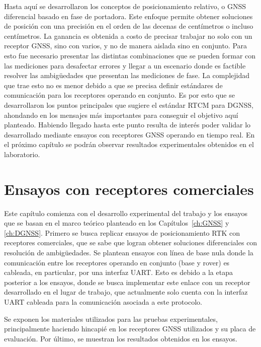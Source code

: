 \documentclass[a4paper,12pt,oneside,onecolumn,final,openright]{book}%
\begin{document}
	Hasta aquí se desarrollaron los conceptos de posicionamiento relativo, o GNSS diferencial basado en fase de portadora. Este enfoque permite obtener soluciones de posición con una precisión en el orden de las decenas de centímetros o incluso centímetros. La ganancia es obtenida a costo de precisar trabajar no solo con un receptor GNSS, sino con varios, y no de manera aislada sino en conjunto. Para esto fue necesario presentar las distintas combinaciones que se pueden formar con las mediciones para desafectar errores y llegar a un escenario donde es factible resolver las ambigüedades que presentan las mediciones de fase. La complejidad que trae esto no es menor debido a que se precisa definir estándares de comunicación para los receptores operando en conjunto. Es por esto que se desarrollaron los puntos principales que sugiere el estándar RTCM para DGNSS, ahondando en los mensajes más importantes para conseguir el objetivo aquí planteado. Habiendo llegado hasta este punto resulta de interés poder validar lo desarrollado mediante ensayos con receptores GNSS operando en tiempo real. En el próximo capítulo se podrán observar resultados experimentales obtenidos en el laboratorio.
\chapter{Ensayos con receptores comerciales}\label{ch:ublox}
	Este capítulo comienza con el desarrollo experimental del trabajo y los ensayos que se basan en el marco teórico planteado en los Capítulos~\ref{ch:GNSS} y \ref{ch:DGNSS}. Primero se busca replicar ensayos de posicionamiento RTK con receptores comerciales, que se sabe que logran obtener soluciones diferenciales con resolución de ambigüedades. Se plantean ensayos con línea de base nula donde la comunicación entre los receptores operando en conjunto (base y rover) es cableada, en particular, por una interfaz UART. Esto es debido a la etapa posterior a los ensayos, donde se busca implementar este enlace con un receptor desarrollado en el lugar de trabajo, que actualmente solo cuenta con la interfaz UART cableada para la comunicación asociada a este protocolo. 
	
	Se exponen los materiales utilizados para las pruebas experimentales, principalmente haciendo hincapié en los receptores GNSS utilizados y su placa de evaluación. Por último, se muestran los resultados obtenidos en los ensayos.

\end{document}

